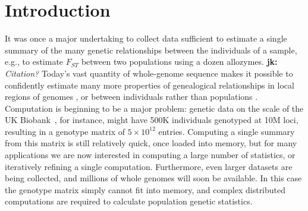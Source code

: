 \documentclass{article}
\newcommand{\jk}[1]{{\color{red}\textbf{jk:} \it #1}}
\begin{document}
%
%
%
%
%
%
%
%
%



\section*{Introduction}

It was once a major undertaking to collect data sufficient to estimate a single summary
of the many genetic relationships between the individuals of a sample,
e.g., to estimate $F_{ST}$ between two populations using a dozen allozymes.
\jk{Citation?}
Today's vast quantity of whole-genome sequence
makes it possible to confidently estimate many more properties of genealogical relationships
in local regions of genomes \citep{stankowski2019widespread,fst_landscapes},
or between individuals rather than populations \citep{individual_stats}.
Computation is beginning to be a major problem:
genetic data on the scale of the UK Biobank~\citep{bycroft2018genome},
for instance, might have 500K individuals genotyped at 10M loci,
resulting in a genotype matrix of $5 \times 10^{12}$ entries.
Computing a single summary from this matrix is still relatively quick,
once loaded into memory,
but for many applications we are now interested in computing a large number of statistics,
or iteratively refining a single computation.
Furthermore, even larger datasets are being collected,
and millions of whole genomes will soon be available. In this case the
genotype matrix simply cannot fit into memory, and complex distributed
computations are required to calculate population genetic statistics.
\end{document}
